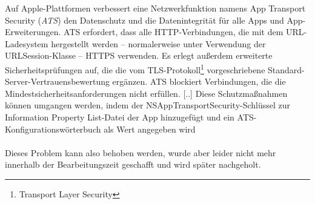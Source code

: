 Auf Apple-Plattformen verbessert eine Netzwerkfunktion namens App Transport Security (\textit{ATS}) den Datenschutz und die Datenintegrität für alle Apps und App-Erweiterungen. ATS erfordert, dass alle HTTP-Verbindungen, die mit dem URL-Ladesystem hergestellt werden – normalerweise unter Verwendung der URLSession-Klasse – HTTPS verwenden. Es erlegt außerdem erweiterte Sicherheitsprüfungen auf, die die vom TLS-Protokoll\footnote{Transport Layer Security} vorgeschriebene Standard-Server-Vertrauensbewertung ergänzen. ATS blockiert Verbindungen, die die Mindestsicherheitsanforderungen nicht erfüllen. [..] Diese Schutzmaßnahmen können umgangen werden, indem der NSAppTransportSecurity-Schlüssel zur Information Property List-Datei der App hinzugefügt und ein ATS-Konfigurationswörterbuch als Wert angegeben wird \cite{Inc}
\\
\\
Dieses Problem kann also behoben werden, wurde aber leider nicht mehr innerhalb der Bearbeitungszeit geschafft und wird später nachgeholt.